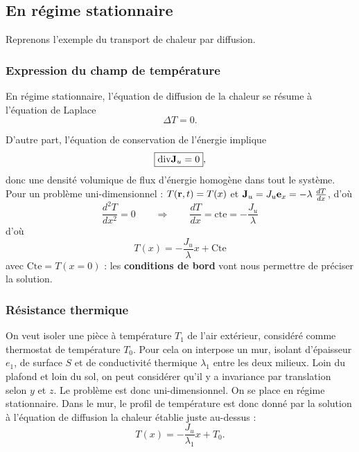 \documentclass[11pt,a4paper]{report}
\begin{document}
\subsection{En régime stationnaire}

Reprenons l'exemple du transport de chaleur par diffusion.

\subsubsection*{Expression du champ de température}

En régime stationnaire, l'équation de diffusion de la chaleur se résume à l'équation de Laplace
\begin{equation}
	\boxed{\Delta T = 0}.
\end{equation}

D'autre part, l'équation de conservation de l'énergie implique
\begin{equation}
	\boxed{\text{div}\bold{J}_u = 0},
\end{equation}
donc une densité volumique de flux d'énergie homogène dans tout le système.\\

Pour un problème uni-dimensionnel : $T(\bold{r},t) = T(x)$ et $\bold{J}_u = J_{u}\bold{e}_x = -\lambda\;\frac{dT}{dx}$, d'où
\begin{equation}
	\frac{d^2 T}{d x^2} = 0 \qquad \Rightarrow \qquad \frac{dT}{dx} = \text{cte} = -\frac{J_u}{\lambda}
\end{equation}
d'où
\begin{equation}
	\boxed{T(x) = - \frac{J_u}{\lambda}x + \text{Cte}}
\end{equation}
avec $\text{Cte} = T(x=0)$ : les \textbf{conditions de bord} vont nous permettre de préciser la solution.

\subsubsection*{Résistance thermique}

On veut isoler une pièce à température $T_1$ de l'air extérieur, considéré comme thermostat de température $T_0$. Pour cela on interpose un mur, isolant d'épaisseur $e_1$, de surface $S$ et de conductivité thermique $\lambda_1$ entre les deux milieux. Loin du plafond et loin du sol, on peut considérer qu'il y a invariance par translation selon $y$ et $z$. Le problème est donc uni-dimensionnel. On se place en régime stationnaire. Dans le mur, le profil de température est donc donné par la solution à l'équation de diffusion la chaleur établie juste au-dessus :
\begin{equation}
	T(x) = -\frac{J_u}{\lambda_1}x + T_0.
\end{equation} 
 
\end{document}
